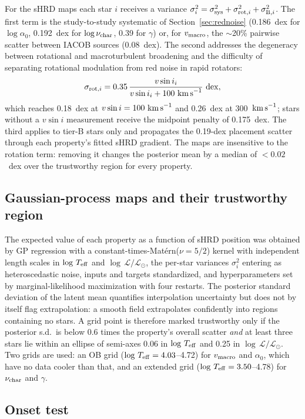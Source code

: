 \documentclass[twocolumn]{aastex631}
\newcommand{\vmac}{v_{\rm macro}}
\newcommand{\vsini}{v\sin i}
\newcommand{\teff}{T_{\rm eff}}
\newcommand{\nuchar}{\nu_{\rm char}}
\renewcommand{\ell}{\mathcal{L}}
\newcommand{\lgL}{\log\,\ell/\ell_\odot}
\newcommand{\lgT}{\log\,\teff}
\newcommand{\kms}{{\rm km\,s}^{-1}}
\begin{document}
For the sHRD maps each star $i$ receives a variance $\sigma_i^2=\sigma_{\rm sys}^2+\sigma_{{\rm rot},i}^2+\sigma_{{\rm B},i}^2$. The first term is the study-to-study systematic of Section~\ref{sec:rednoise} (0.186~dex for $\log\alpha_0$, 0.192~dex for $\log\nuchar$, 0.39 for $\gamma$) or, for $\vmac$, the $\sim$20\% pairwise scatter between IACOB sources (0.08~dex). The second addresses the degeneracy between rotational and macroturbulent broadening and the difficulty of separating rotational modulation from red noise in rapid rotators:
\begin{equation}
\sigma_{{\rm rot},i}=0.35\,\frac{\vsini_i}{\vsini_i+100~\kms}~{\rm dex},
\end{equation}
which reaches 0.18~dex at $\vsini=100~\kms$ and 0.26~dex at 300~$\kms$; stars without a $\vsini$ measurement receive the midpoint penalty of 0.175~dex. The third applies to tier-B stars only and propagates the 0.19-dex placement scatter through each property's fitted sHRD gradient. The maps are insensitive to the rotation term: removing it changes the posterior mean by a median of $<0.02$~dex over the trustworthy region for every property.

\subsection{Gaussian-process maps and their trustworthy region}\label{sec:gp}

The expected value of each property as a function of sHRD position was obtained by GP regression with a constant-times-Mat\'ern($\nu=5/2$) kernel with independent length scales in $\lgT$ and $\lgL$, the per-star variances $\sigma_i^2$ entering as heteroscedastic noise, inputs and targets standardized, and hyperparameters set by marginal-likelihood maximization with four restarts. The posterior standard deviation of the latent mean quantifies interpolation uncertainty but does not by itself flag extrapolation: a smooth field extrapolates confidently into regions containing no stars. A grid point is therefore marked trustworthy only if the posterior s.d.\ is below 0.6 times the property's overall scatter \emph{and} at least three stars lie within an ellipse of semi-axes 0.06 in $\lgT$ and 0.25 in $\lgL$. Two grids are used: an OB grid ($\lgT=4.03$--4.72) for $\vmac$ and $\alpha_0$, which have no data cooler than that, and an extended grid ($\lgT=3.50$--4.78) for $\nuchar$ and $\gamma$.

\subsection{Onset test}\label{sec:onset_method}
\end{document}
